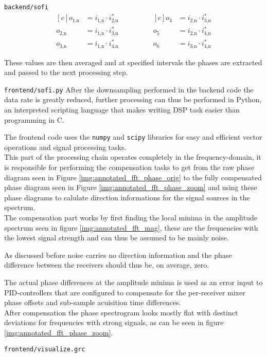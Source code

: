 \begin{subchapter}{\texttt{backend/sofi}}
  \begin{equation*}
    \begin{aligned}[c]
      o_\text{1,n}&= i_\text{1,n} \cdot i_\text{2,n}^{\ast} \\
      o_\text{2,n}&= i_\text{1,n} \cdot i_\text{3,n}^{\ast} \\
      o_\text{3,n}&= i_\text{1,n} \cdot i_\text{4,n}^{\ast}
    \end{aligned}
    \qquad \qquad
    \begin{aligned}[c]
      o_\text{4}&= i_\text{2,n} \cdot i_\text{3,n}^{\ast} \\
      o_\text{5}&= i_\text{2,n} \cdot i_\text{4,n}^{\ast} \\
      o_\text{6}&= i_\text{3,n} \cdot i_\text{4,n}^{\ast}
    \end{aligned}
  \end{equation*}

  These values are then averaged and at specified
  intervals the phases are extracted and passed to
  the next processing step.
\end{subchapter}

\begin{subchapter}{\texttt{frontend/sofi.py}}
  After the downsampling performed in the backend code
  the data rate is greatly reduced, further processing
  can thus be performed in Python, an interpreted scripting
  language that makes writing DSP task easier
  than programming in C.

  The frontend code uses the \texttt{numpy} and
  \texttt{scipy} libraries for easy and efficient
  vector operations and signal processing tasks. \\

  This part of the processing chain operates completely
  in the frequency-domain, it is responsible for
  performing the compensation tasks to get from the
  raw phase diagram seen in Figure \ref{img:annotated_fft_phase_orig}
  to the fully compensated phase diagram
  seen in Figure \ref{img:annotated_fft_phase_zoom}
  and using these phase diagrams to calulate direction informations
  for the signal sources in the spectrum. \\

  The compensation part works by first finding the local minima in
  the amplitude spectrum seen in figure \ref{img:annotated_fft_mag},
  these are the frequencies with the lowest signal strength
  and can thus be assumed to be mainly noise.

  As discussed before noise carries no direction
  information and the phase difference between the
  receivers should thus be, on average, zero.

  The actual phase differences at the amplitude minima
  is used as an error input to PID-controllers that
  are configured to compensate for the per-receiver
  mixer phase offsets and sub-sample acuisition
  time differences. \\

  After compensation the phase spectrogram looks mostly
  flat with destinct deviations for frequencies
  with strong signals, as can be seen in
  figure \ref{img:annotated_fft_phase_zoom}.
\end{subchapter}

\begin{subchapter}{\texttt{frontend/visualize.grc}}
\end{subchapter}
